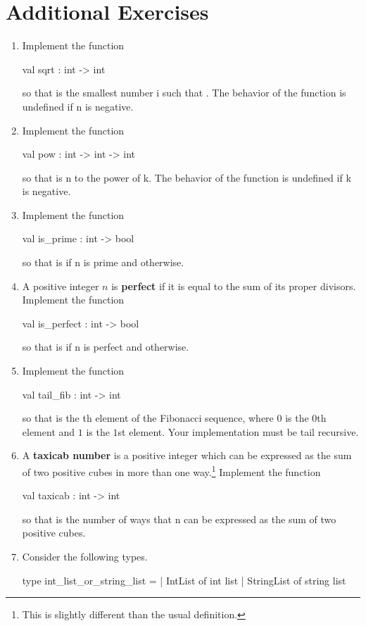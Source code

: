 \section{Additional Exercises}

\begin{enumerate}
\item
  Implement the function
  \begin{ocaml}
    val sqrt : int -> int
  \end{ocaml}
  so that  is the smallest number \codel i such that .
  The behavior of the function is undefined if \codel n is negative.
\item
  Implement the function
  \begin{ocaml}
    val pow : int -> int -> int
  \end{ocaml}
  so that  is \codel n to the power of \codel k.
  The behavior of the function is undefined if \codel k is negative.
\item
  Implement the function
  \begin{ocaml}
    val is_prime : int -> bool
  \end{ocaml}
  so that  is  if \codel n is prime and  otherwise.
\item
  A positive integer $n$ is \textbf{perfect} if it is equal to the sum of its proper divisors.
  Implement the function
  \begin{ocaml}
    val is_perfect : int -> bool
  \end{ocaml}
  so that  is  if \codel n is perfect and  otherwise.
\item
  Implement the function
  \begin{ocaml}
    val tail_fib : int -> int
  \end{ocaml}
  so that  is the th element of the Fibonacci sequence, where $0$ is the $0$th element and $1$ is the $1$st element.
  Your implementation must be tail recursive.
\item
  A \textbf{taxicab number} is a positive integer which can be expressed as the sum of two positive cubes in more than one way.\footnote{This is slightly different than the usual definition.}
  Implement the function
  \begin{ocaml}
    val taxicab : int -> int
  \end{ocaml}
  so that  is the number of ways that \codel n can be expressed as the sum of two positive cubes.
\item
  Consider the following types.
  \begin{ocaml}
    type int_list_or_string_list =
      | IntList of int list
      | StringList of string list


\end{ocaml}
\end{enumerate}

